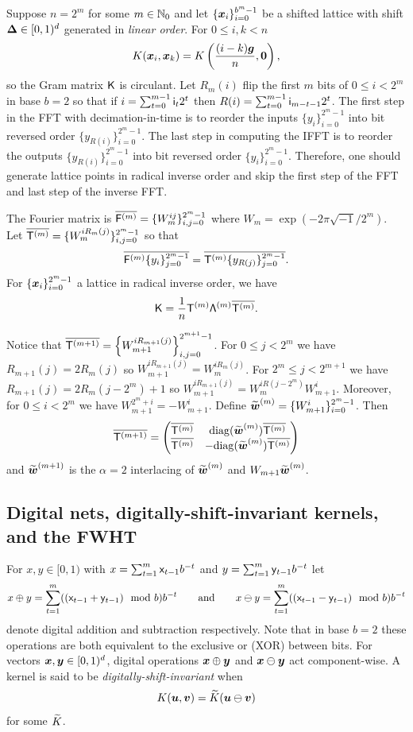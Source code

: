 \documentclass[acmsmall]{acmart}
\begin{document}
Suppose $n=2^m$ for some $m \in {\mathbb{N}}_0$ and let $\{{\boldsymbol{x}}_i\}_{i=0}^{b^m-1}$ be a shifted lattice with shift ${\boldsymbol{\Delta}} \in [0,1)^d$ generated in \emph{linear order}. For $0 \leq i,k < n$
$$K({\boldsymbol{x}}_i,{\boldsymbol{x}}_k) = K\left(\frac{(i-k) {\boldsymbol{g}}}{n},{\boldsymbol{0}}\right),$$ 
so the Gram matrix ${\mathsf{K}}$ is circulant. Let $R_m(i)$ flip the first $m$ bits of $0 \leq i < 2^m$ in base $b=2$ so that if $i=\sum_{t=0}^{m-1} {\mathsf{i}}_t 2^t$ then $R(i) = \sum_{t=0}^{m-1} {\mathsf{i}}_{m-t-1} 2^t$. The first step in the FFT with decimation-in-time is to reorder the inputs $\{y_i\}_{i=0}^{2^m-1}$ into bit reversed order $\{y_{R(i)}\}_{i=0}^{2^m-1}$. The last step in computing the IFFT is to reorder the outputs $\{y_{R(i)}\}_{i=0}^{2^m-1}$ into bit reversed order $\{y_i\}_{i=0}^{2^m-1}$. Therefore, one should generate lattice points in radical inverse order and skip the first step of the FFT and last step of the inverse FFT. 

The Fourier matrix is $\overline{{\mathsf{F}}^{(m)}} = \{W_m^{ij}\}_{i,j=0}^{2^m-1}$ where $W_m = \exp(-2 \pi \sqrt{-1}/2^m)$. Let $\overline{{\mathsf{T}}^{(m)}} = \{W_m^{iR_m(j)}\}_{i,j=0}^{2^m-1}$ so that  
$$\overline{{\mathsf{F}}^{(m)} \{y_i\}_{j=0}^{2^m-1}} = \overline{{\mathsf{T}}^{(m)} \{y_{R(j)}\}_{j=0}^{2^m-1}}.$$
For $\{{\boldsymbol{x}}_i\}_{i=0}^{2^m-1}$ a lattice in radical inverse order, we have 
$${\mathsf{K}} = \frac{1}{n} {\mathsf{T}}^{(m)} {\mathsf{\Lambda}}^{(m)} \overline{{\mathsf{T}}^{(m)}}.$$

Notice that $\overline{{\mathsf{T}}^{(m+1)}} = \left\{W_{m+1}^{i R_{m+1}(j)}\right\}_{i,j=0}^{2^{m+1}-1}$. For $0 \leq j < 2^m$ we have $R_{m+1}(j) = 2 R_m(j)$ so $W^{i R_{m+1}(j)}_{m+1}= W^{i R_m(j)}_m$. For $2^m \leq j < 2^{m+1}$ we have $R_{m+1}(j) = 2R_m(j-2^m)+1$ so $W^{i R_{m+1}(j)}_{m+1} = W_m^{i R(j-2^m)} W_{m+1}^i$. Moreover, for $0 \leq i < 2^m$ we have $W_{m+1}^{2^m+i} = -W_{m+1}^i$. Define ${\widetilde{\boldsymbol{w}}}^{(m)} = \{W_{m+1}^i\}_{i=0}^{2^m-1}$. Then 
$$\overline{{\mathsf{T}}^{(m+1)}} = \begin{pmatrix} \overline{{\mathsf{T}}^{(m)}} & \mathrm{diag}({\widetilde{\boldsymbol{w}}}^{(m)}) \overline{{\mathsf{T}}^{(m)}} \\ \overline{{\mathsf{T}}^{(m)}} & - \mathrm{diag}({\widetilde{\boldsymbol{w}}}^{(m)}) \overline{{\mathsf{T}}^{(m)}} \end{pmatrix}$$
and ${\widetilde{\boldsymbol{w}}}^{(m+1)}$ is the $\alpha=2$ interlacing of ${\widetilde{\boldsymbol{w}}}^{(m)}$ and $W_{m+1} {\widetilde{\boldsymbol{w}}}^{(m)}$. 

\subsection{Digital nets, digitally-shift-invariant kernels, and the FWHT} \label{subsec:DSI_kernels}

For $x,y \in [0,1)$ with $x = \sum_{t=1}^{m} {\mathsf{x}}_{t-1} b^{-t}$ and $y = \sum_{t=1}^m {\mathsf{y}}_{t-1} b^{-t}$ let 
$$x \oplus y = \sum_{t=1}^m (({\mathsf{x}}_{t-1} + {\mathsf{y}}_{t-1}) \mod b) b^{-t} \qquad\text{and}\qquad x \ominus y = \sum_{t=1}^m (({\mathsf{x}}_{t-1} - {\mathsf{y}}_{t-1}) \mod b) b^{-t}$$
denote digital addition and subtraction respectively. Note that in base $b=2$ these operations are both equivalent to the exclusive or (XOR) between bits.  For vectors ${\boldsymbol{x}},{\boldsymbol{y}} \in [0,1)^d$, digital operations ${\boldsymbol{x}} \oplus {\boldsymbol{y}}$ and  ${\boldsymbol{x}} \ominus {\boldsymbol{y}}$ act component-wise. 
A kernel is said to be \emph{digitally-shift-invariant} when 
$$K({\boldsymbol{u}}, {\boldsymbol{v}}) = {\widetilde{K}}({\boldsymbol{u}} \ominus {\boldsymbol{v}})$$
for some ${\widetilde{K}}$. 
\end{document}
